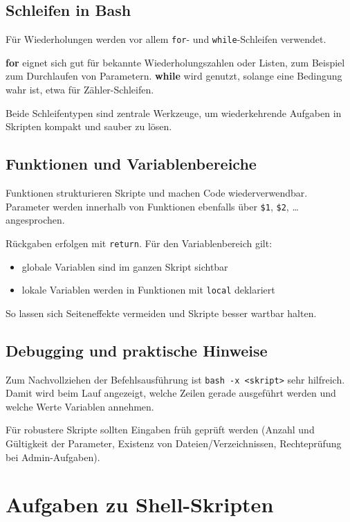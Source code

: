 \documentclass[11pt, oneside, numbers=nönddot]{scrbook}
\begin{document}
\section{Schleifen in Bash}
Für Wiederholungen werden vor allem \texttt{for}- und \texttt{while}-Schleifen verwendet.

\textbf{for} eignet sich gut für bekannte Wiederholungszahlen oder Listen, zum Beispiel zum Durchlaufen von Parametern. \textbf{while} wird genutzt, solange eine Bedingung wahr ist, etwa für Zähler-Schleifen.

Beide Schleifentypen sind zentrale Werkzeuge, um wiederkehrende Aufgaben in Skripten kompakt und sauber zu lösen.

\section{Funktionen und Variablenbereiche}
Funktionen strukturieren Skripte und machen Code wiederverwendbar. Parameter werden innerhalb von Funktionen ebenfalls über \texttt{\$1}, \texttt{\$2}, \dots angesprochen.

Rückgaben erfolgen mit \texttt{return}. Für den Variablenbereich gilt:
\begin{itemize}
\item globale Variablen sind im ganzen Skript sichtbar
\item lokale Variablen werden in Funktionen mit \texttt{local} deklariert
\end{itemize}
So lassen sich Seiteneffekte vermeiden und Skripte besser wartbar halten.

\section{Debugging und praktische Hinweise}
Zum Nachvollziehen der Befehlsausführung ist \texttt{bash -x <skript>} sehr hilfreich. Damit wird beim Lauf angezeigt, welche Zeilen gerade ausgeführt werden und welche Werte Variablen annehmen.

Für robustere Skripte sollten Eingaben früh geprüft werden (Anzahl und Gültigkeit der Parameter, Existenz von Dateien/Verzeichnissen, Rechteprüfung bei Admin-Aufgaben).

\chapter{Aufgaben zu Shell-Skripten}
\end{document}
